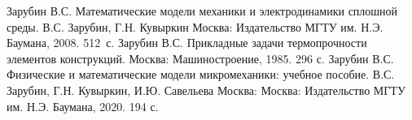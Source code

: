\documentclass[12pt,a4paper]{article}
\begin{document}
\begin{thebibliography}{6}
	Зарубин В.С. Математические модели механики и электродинамики сплошной среды. В.С. Зарубин, Г.Н. Кувыркин Москва: Издательство МГТУ им. Н.Э. Баумана, 2008. 512~с.
 Зарубин В.С. Прикладные задачи термопрочности элементов конструкций. Москва: Машиностроение, 1985. 296 с.  
 Зарубин В.С. Физические и математические модели микромеханики: учебное пособие. В.С. Зарубин, Г.Н. Кувыркин, И.Ю. Савельева Москва: Москва: Издательство МГТУ им. Н.Э. Баумана, 2020. 194 с.
\end{thebibliography}
\end{document}
